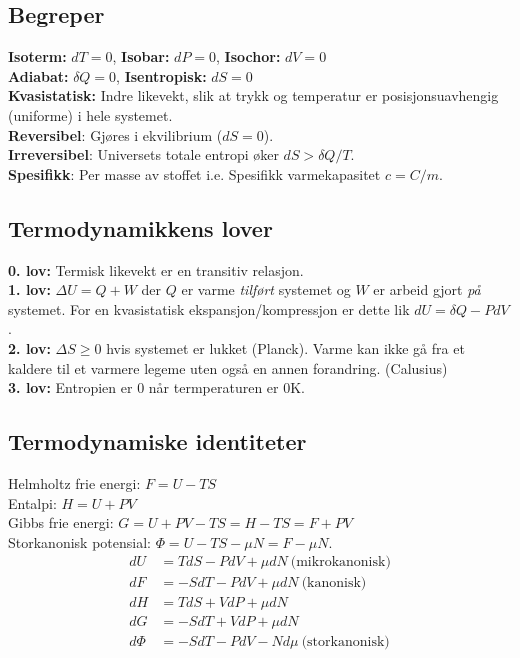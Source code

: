 \documentclass[a4paper, norsk, 10pt]{article}
\newcommand{\EQU}[1] { \begin{equation*} \begin{split}
#1  
\end{split} \end{equation*} }
\begin{document}
\begin{multicols*}{2}

\subsection*{Begreper}
\textbf{Isoterm:} $dT=0$, \textbf{Isobar:} $dP=0$, \textbf{Isochor:} $dV=0$ \\ 
\textbf{Adiabat:} $\delta Q=0$,  \textbf{Isentropisk:} $d S=0$   \\
\textbf{Kvasistatisk:} Indre likevekt, slik at trykk og temperatur er posisjonsuavhengig (uniforme) i hele systemet. \\
\textbf{Reversibel}: Gjøres i ekvilibrium ($dS=0$).  \\
\textbf{Irreversibel}: Universets totale entropi øker $dS>\delta Q/T$. \\
\textbf{Spesifikk}: Per masse av stoffet i.e. Spesifikk varmekapasitet $c=C/m$.

\subsection*{Termodynamikkens lover}
\textbf{0. lov:} Termisk likevekt er en transitiv relasjon. \\
\textbf{1. lov:} $\Delta U = Q+W$ der $Q$ er varme \textit{tilført} systemet og $W$ er arbeid gjort \textit{på} systemet. For en kvasistatisk ekspansjon/kompressjon er dette lik $dU=\delta Q-PdV$.  \\
\textbf{2. lov:} $\Delta S \geq 0$ hvis systemet er lukket (Planck). Varme kan ikke gå fra et kaldere til et varmere legeme uten også en annen forandring. (Calusius) \\
\textbf{3. lov:} Entropien er $0$ når termperaturen er $0$K.

\subsection*{Termodynamiske identiteter}
Helmholtz frie energi: $F=U-TS$\\
Entalpi: $H=U+PV$ \\
Gibbs frie energi: $G=U+PV-TS=H-TS=F+PV$\\ 
Storkanonisk potensial: $\Phi=U-TS-\mu N = F-\mu N$.
\EQU{
dU &= TdS-PdV+ \mu dN \ \text{(mikrokanonisk)} \\
dF &= -SdT-PdV+ \mu dN \ \text{(kanonisk)} \\
dH &= TdS+VdP+ \mu dN \\
dG &= -SdT+VdP+ \mu dN \\
d\Phi &= -SdT-PdV- Nd\mu \ \text{(storkanonisk)} \\
}



\end{multicols*}
\end{document}
